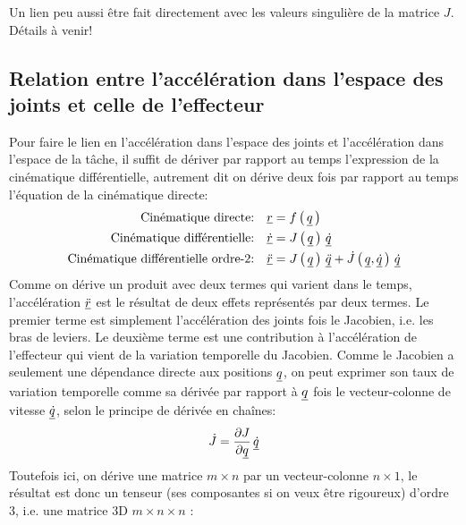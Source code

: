 Un lien peu aussi être fait directement avec les valeurs singulière de la matrice $J$. Détails à venir!







\newpage
\subsection{Relation entre l'accélération dans l'espace des joints et celle de l'effecteur}
\label{sec:accjointspace}


Pour faire le lien en l'accélération dans l'espace des joints et l'accélération dans l'espace de la tâche, il suffit de dériver par rapport au temps l'expression de la cinématique différentielle, autrement dit on dérive deux fois par rapport au temps l'équation de la cinématique directe:
\begin{align}
\text{Cinématique directe:}  \quad \underline{r} &= f\left( \, \underline{q} \, \right) \\
\text{Cinématique différentielle:} \quad \underline{\dot{r}} &= J\left( \, \underline{q} \, \right) \, \underline{\dot{q}} \\
\text{Cinématique différentielle ordre-2:} \quad \underline{\ddot{r}} &= J\left( \, \underline{q} \, \right) \, \underline{\ddot{q}}  + \dot{J} \left( \, \underline{q}  , \underline{\dot{q}} \, \right) \, \underline{\dot{q}} 
\label{eq:ddj}
\end{align}
Comme on dérive un produit avec deux termes qui varient dans le temps, l'accélération $\underline{\ddot{r}}$ est le résultat de deux effets représentés par deux termes. Le premier terme est simplement l'accélération des joints fois le Jacobien, i.e. les bras de leviers. Le deuxième terme est une contribution à l'accélération de l'effecteur qui vient de la variation temporelle du Jacobien. Comme le Jacobien a seulement une dépendance directe aux positions $\underline{q}$, on peut exprimer son taux de variation temporelle comme sa dérivée par rapport à $\underline{q}$ fois le vecteur-colonne de vitesse $\underline{\dot{q}}$, selon le principe de dérivée en chaînes:
\begin{align}
\dot{J} = \frac{ \partial J}{\partial \underline{q}} \, \underline{\dot{q}} 
\end{align}
Toutefois ici, on dérive une matrice $m \times n$ par un vecteur-colonne $n \times 1$, le résultat est donc un tenseur (ses composantes si on veux être rigoureux) d'ordre 3, i.e. une matrice 3D $m \times n \times n$ :
